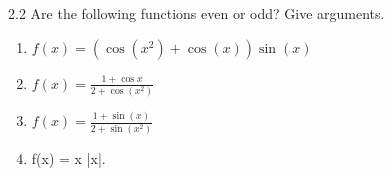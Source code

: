 

\begin{problem}{2.2}
  Are the following functions even or odd?
  Give arguments.
  \begin{enumerate}[label=\alph*)]
    \item $f(x) = \left( \cos \left( x^2 \right) + \cos (x) \right) \sin(x)$
    \item $f(x) = \frac{1 + \cos x}{2 + \cos \left( x^2 \right)}$
    \item $f(x) = \frac{1 + \sin(x)}{2 +\sin \left( x^2 \right)}$
    \item f(x) = x |x|.
  \end{enumerate}
\end{problem}

